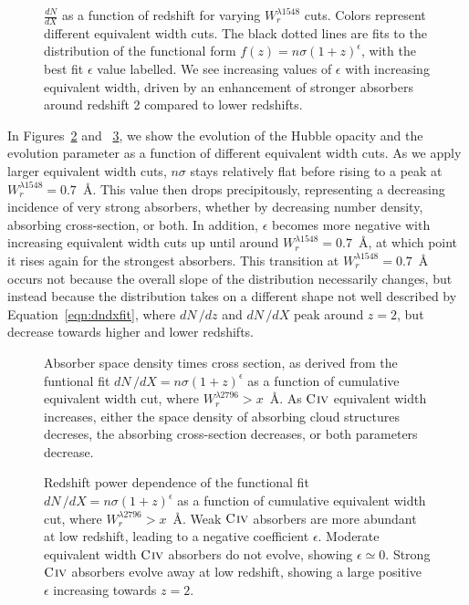 \documentclass[linenumbers,twocolumn]{aastex61}
\begin{document}
\begin{figure}[bth]
\caption{$\frac{dN}{dX}$ as a function of redshift for varying $W_r^{\lambda1548}$ cuts. Colors represent different equivalent width cuts. The black dotted lines are fits to the distribution of the functional form $f(z) = n\sigma (1 + z)^{\epsilon}$, with the best fit $\epsilon$ value labelled. We see increasing values of $\epsilon$ with increasing equivalent width, driven by an enhancement of stronger {\CIV} absorbers around redshift 2 compared to lower redshifts.}
\label{fig:dndx_cuts}
\end{figure}

In Figures~\ref{fig:nsigma} and ~\ref{fig:epsilon}, we show the evolution of the Hubble opacity and the evolution parameter as a function of different equivalent width cuts. As we apply larger equivalent width cuts, $n\sigma$ stays relatively flat before rising to a peak at $W_r^{\lambda1548} = 0.7$~{\AA}. This value then drops precipitously, representing a decreasing incidence of very strong {\CIV} absorbers, whether by decreasing number density, absorbing cross-section, or both. In addition, $\epsilon$ becomes more negative with increasing equivalent width cuts up until around $W_r^{\lambda1548} = 0.7$~{\AA}, at which point it rises again for the strongest {\CIV} absorbers. This transition at $W_r^{\lambda1548} = 0.7$~{\AA} occurs not because the overall slope of the distribution necessarily changes, but instead because the distribution takes on a different shape not well described by Equation~\ref{eqn:dndxfit}, where $dN\,/dz$ and $dN\,/dX$ peak around $z = 2$, but decrease towards higher and lower redshifts.

\begin{figure}[bth]
\caption{Absorber space density times cross section, as derived from the funtional fit $dN\,/dX = n\sigma (1 + z)^{\epsilon}$ as a function of cumulative equivalent width cut, where $W_r^{\lambda2796} > x$~{\AA}. As ${\hbox{{\rm C}\kern 0.1em{\sc iv}}}$ equivalent width increases, either the space density of absorbing cloud structures decreses, the absorbing cross-section decreases, or both parameters decrease.}
\label{fig:nsigma}
\end{figure}

\begin{figure}[bth]
\caption{Redshift power dependence of the functional fit $dN\,/dX = n\sigma (1 + z)^{\epsilon}$ as a function of cumulative equivalent width cut, where $W_r^{\lambda2796} > x$~{\AA}. Weak ${\hbox{{\rm C}\kern 0.1em{\sc iv}}}$ absorbers are more abundant at low redshift, leading to a negative coefficient $\epsilon$. Moderate equivalent width ${\hbox{{\rm C}\kern 0.1em{\sc iv}}}$ absorbers do not evolve, showing $\epsilon \simeq 0$. Strong ${\hbox{{\rm C}\kern 0.1em{\sc iv}}}$ absorbers evolve away at low redshift, showing a large positive $\epsilon$ increasing towards $z = 2$.}
\label{fig:epsilon}
\end{figure}
\end{document}
